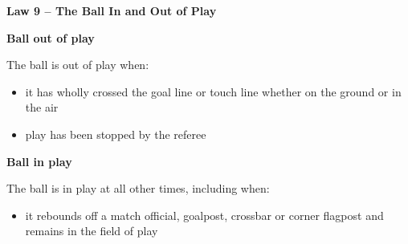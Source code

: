\clearpage
\sffamily
{\bfseries\color[rgb]{0.4,0.4,0.4}
Law 9 -- The Ball In and Out of Play}
{}

\bigskip

{\bfseries Ball out of play}

\headlinebox

The ball is out of play when:

\begin{itemize}
\item it has wholly crossed the goal line or touch line whether on the ground or in the air
\item play has been stopped by the referee
\end{itemize}

{\bfseries Ball in play }

\headlinebox

The ball is in play at all other times, including when:

\begin{itemize}
\item it rebounds off a match official, goalpost, crossbar or corner flagpost
      and remains in the field of play
\end{itemize}
